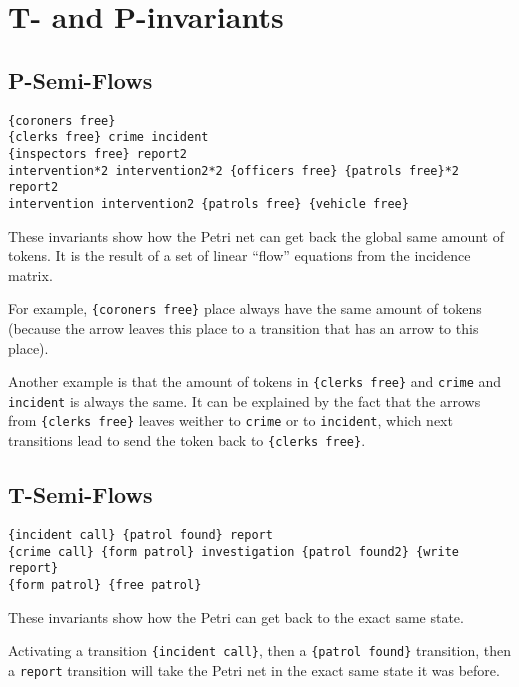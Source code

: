 \section{T- and P-invariants}
\label{sec:T- and P-invariants}

\subsection{P-Semi-Flows}

\begin{lstlisting}
{coroners free}
{clerks free} crime incident
{inspectors free} report2
intervention*2 intervention2*2 {officers free} {patrols free}*2 report2
intervention intervention2 {patrols free} {vehicle free}
\end{lstlisting}

These invariants show how the Petri net can get back the global same amount of tokens. It is the result of a set of linear \enquote{flow} equations from the incidence matrix. \newline

For example, \verb#{coroners free}# place always have the same amount of tokens (because the arrow leaves this place to a transition that has an arrow to this place). \newline

Another example is that the amount of tokens in \verb#{clerks free}# and \verb#crime# and \verb#incident# is always the same. It can be explained by the fact that the arrows from \verb#{clerks free}# leaves weither to \verb#crime# or to \verb#incident#, which next transitions lead to send the token back to \verb#{clerks free}#. \newline

\subsection{T-Semi-Flows}

\begin{lstlisting}
{incident call} {patrol found} report
{crime call} {form patrol} investigation {patrol found2} {write report}
{form patrol} {free patrol}
\end{lstlisting}

These invariants show how the Petri can get back to the exact same state. \newline

Activating a transition \verb#{incident call}#, then a \verb#{patrol found}# transition, then a \verb#report# transition will take the Petri net in the exact same state it was before.
